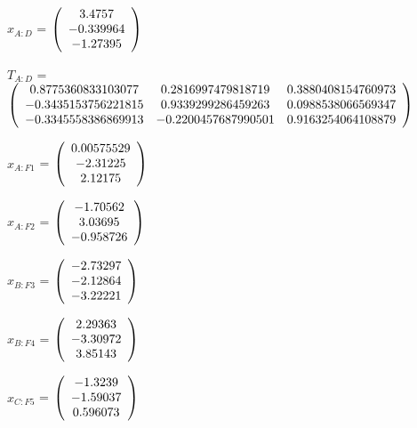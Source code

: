 \begin{description}
$x_{A:D}$ = $\left( \begin{array} {ccc}     3.4757 \\  -0.339964 \\   -1.27395
\end{array} \right)\\ \\$

$T_{A:D}$ = $\left( \begin{array} {ccc}
   0.8775360833103077 & 0.2816997479818719 & 0.3880408154760973 \\
   -0.3435153756221815 & 0.9339299286459263 & 0.0988538066569347 \\
   -0.3345558386869913 & -0.2200457687990501 & 0.9163254064108879 \\
\end{array} \right)\\ \\$

$x_{A:F1}$ = $\left( \begin{array} {ccc} 0.00575529 \\   -2.31225 \\    2.12175
\end{array} \right)\\ \\$

$x_{A:F2}$ = $\left( \begin{array} {ccc}   -1.70562 \\    3.03695 \\  -0.958726
\end{array} \right)\\ \\$

$x_{B:F3}$ = $\left( \begin{array} {ccc}   -2.73297 \\   -2.12864 \\   -3.22221
\end{array} \right)\\ \\$

$x_{B:F4}$ = $\left( \begin{array} {ccc}    2.29363 \\   -3.30972 \\    3.85143
\end{array} \right)\\ \\$

$x_{C:F5}$ = $\left( \begin{array} {ccc}    -1.3239 \\   -1.59037 \\   0.596073
\end{array} \right)\\ \\$


\end{description}
